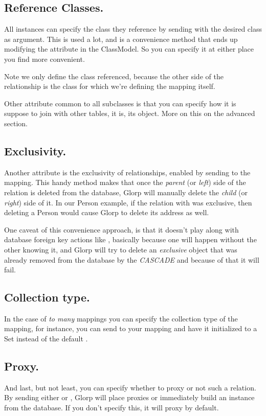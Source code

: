 \documentclass[10pt,twoside,english]{_support/latex/sbabook/sbabook}
\begin{document}
\subsection{Reference Classes.}
All  instances can specify the class they reference
by sending  with the desired class as argument. This is
used a lot, and is a convenience method that ends up modifying the attribute
in the ClassModel. So you can specify it at either place you find more
convenient.

Note we only define the class referenced, because the other side of the
relationship is the class for which we're defining the mapping itself.

Other attribute common to all  subclasses is that
you can specify how it is suppose to join with other tables, it is,
its  object. More on this on the advanced section.
\subsection{Exclusivity.}
Another attribute is the exclusivity of relationships, enabled by sending
 to the mapping. This handy method makes that once the \textit{parent}
(or \textit{left}) side of the relation is deleted from the database, Glorp will
manually delete the \textit{child} (or \textit{right}) side of it.
In our Person example, if the relation with  was exclusive,
then deleting a Person would cause Glorp to delete its address as well.

One caveat of this convenience approach, is that it doesn't play along with database
foreign key actions like , basically because one will
happen without the other knowing it, and Glorp will try to delete an
\textit{exclusive} object that was already removed from the database
by the \textit{CASCADE} and because of that it will fail.
\subsection{Collection type.}
In the case of \textit{to many} mappings you can specify the collection type
of the mapping, for instance, you can send  to your
mapping and have it initialized to a Set instead of the default .
\subsection{Proxy.}
And last, but not least, you can specify whether to proxy or not such a relation.
By sending  either  or , Glorp will
place proxies or immediately build an instance from the database. If you don't specify this, it will proxy by default.
\end{document}
